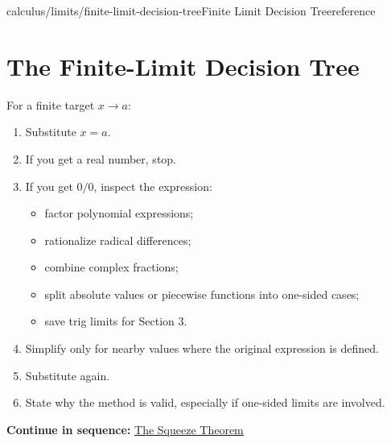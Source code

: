 \documentclass[11pt,openany]{book}
\theoremstyle{bgplain}
\newcommand{\webnext}[2]{%
  \par\addvspace{1.2em}\noindent{\color{BGLine}\rule{\textwidth}{0.35pt}}\par\smallskip
  {\small\color{BGGray}\textbf{Continue in sequence:} \hyperlink{web:#1}{#2}}\par
}
\begin{document}
\begin{webpage}{calculus/limits/finite-limit-decision-tree}{Finite Limit Decision Tree}{reference}
\section{The Finite-Limit Decision Tree}

\begin{bgmethod}[title={A Repeatable Homework Procedure}]
For a finite target \(x\to a\):
\begin{enumerate}
  \item Substitute \(x=a\).
  \item If you get a real number, stop.
  \item If you get \(0/0\), inspect the expression:
  \begin{itemize}
    \item factor polynomial expressions;
    \item rationalize radical differences;
    \item combine complex fractions;
    \item split absolute values or piecewise functions into one-sided cases;
    \item save trig limits for Section 3.
  \end{itemize}
  \item Simplify only for nearby values where the original expression is defined.
  \item Substitute again.
  \item State why the method is valid, especially if one-sided limits are involved.
\end{enumerate}
\end{bgmethod}
\webnext{calculus/limits/squeeze-theorem}{The Squeeze Theorem}
\end{webpage}
\end{document}
